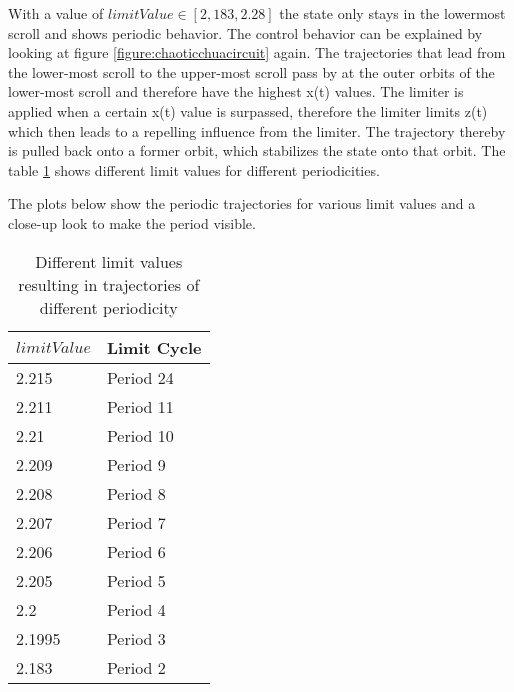 \documentclass[main]{subfiles}
\begin{document}
With a value of \(limitValue \in [2,183, 2.28]\) the state only stays in the lowermost scroll and shows periodic behavior. The control behavior can be explained by looking at figure \ref{figure:chaoticchuacircuit} again. The trajectories that lead from the lower-most scroll to the upper-most scroll pass by at the outer orbits of the lower-most scroll and therefore have the highest x(t) values. The limiter is applied when a certain x(t) value is surpassed, therefore the limiter limits z(t) which then leads to a repelling influence from the limiter. The trajectory thereby is pulled back onto a former orbit, which stabilizes the state onto that orbit. The table \ref{table:periodicities} shows different limit values for different periodicities.

\begin{comment}
\begin{table}
\center
\begin{tabular}{|l|l|l|l|l|l|l|l|l|l|l|l|l|}
   \hline
   limitValue & 2.215 & 2.211 & 2.2105 & 2.2101 & 2.2101 &  2.208 & 2.207 & 2.206 & 2.205 & 2.1995 & 2.183 \\
   \hline
   Limit Cycle Period & 24 & 11 & 9 & 8 & 7 & 6 & 5 & 4 & 3 & 2 \\
   \hline
\end{tabular}
\caption{Whatever}
\label{table:periodicities}
\end{table}
\end{comment}

The plots below show the periodic trajectories for various limit values and a close-up look to make the period visible.

\begin{table}[H]
\renewcommand{\arraystretch}{1.2}
\center
\begin{tabular}{@{}ll@{}}
	\toprule
   \(limitValue\) & Limit Cycle\\
   \midrule
   2.215 & Period 24 \\ 
   2.211 & Period 11 \\
   2.21  & Period 10 \\
   2.209 & Period 9 \\
   2.208 & Period 8 \\
   2.207 & Period 7 \\
   2.206 & Period 6 \\
   2.205 & Period 5 \\
   2.2 & Period 4 \\
   2.1995 & Period 3 \\
   2.183 & Period 2 \\
   \bottomrule
\end{tabular}
\caption{Different limit values resulting in trajectories of different periodicity}
\label{table:periodicities}
\end{table}
\end{document}
